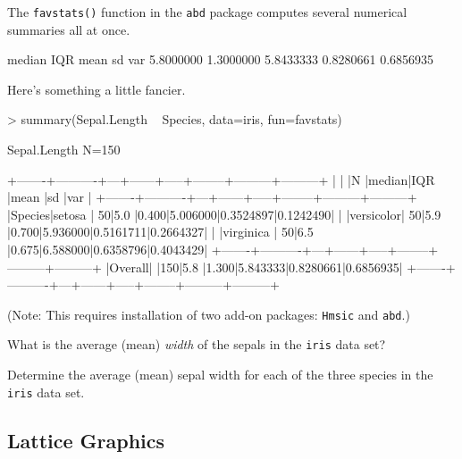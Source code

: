 The \verb!favstats()! function in the \verb!abd! package computes several numerical 
summaries all at once.

\begin{Schunk}
\begin{Soutput}
   median       IQR      mean        sd       var 
5.8000000 1.3000000 5.8433333 0.8280661 0.6856935 
\end{Soutput}
\end{Schunk}

Here's something a little fancier.

\begin{Schunk}
\begin{Sinput}
> summary(Sepal.Length ~ Species, data=iris, fun=favstats)
\end{Sinput}
\begin{Soutput}
Sepal.Length    N=150

+-------+----------+---+------+-----+--------+---------+---------+
|       |          |N  |median|IQR  |mean    |sd       |var      |
+-------+----------+---+------+-----+--------+---------+---------+
|Species|setosa    | 50|5.0   |0.400|5.006000|0.3524897|0.1242490|
|       |versicolor| 50|5.9   |0.700|5.936000|0.5161711|0.2664327|
|       |virginica | 50|6.5   |0.675|6.588000|0.6358796|0.4043429|
+-------+----------+---+------+-----+--------+---------+---------+
|Overall|          |150|5.8   |1.300|5.843333|0.8280661|0.6856935|
+-------+----------+---+------+-----+--------+---------+---------+
\end{Soutput}
\end{Schunk}
(Note: This requires installation of two add-on packages: \verb!Hmsic! 
and \verb!abd!.)

\begin{problem}
What is the average (mean) \emph{width} of the sepals in the \verb!iris! data set?
\end{problem}

\begin{problem}
Determine the average (mean) sepal width for each of the three species in the \verb!iris! data set.
\end{problem}

\subsection{Lattice Graphics}


